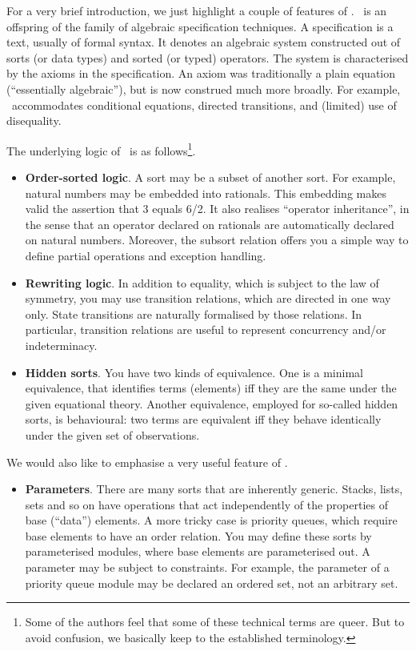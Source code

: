 \documentclass[a4paper]{memoir}
\begin{document}
For a very brief introduction, we just highlight a couple of features
of \cafeobj. \cafeobj~is an offspring of the family of algebraic
specification techniques. A specification is a text, usually of
formal syntax. It denotes an algebraic system constructed out of
sorts (or data types) and sorted (or typed) operators. The system
is characterised by the axioms in the specification. An axiom was
traditionally a plain equation (``essentially algebraic''), but is now
construed much more broadly. For example, \cafeobj~accommodates
conditional equations, directed transitions, and (limited) use of
disequality.

The underlying logic of \cafeobj~is as follows\footnote{
 Some of the authors feel that some of these technical terms are
 queer. But to avoid confusion, we basically keep to the
 established terminology.
}.
\begin{itemize}
\item[]\textbf{ Order-sorted logic}\cite{osa}. A sort may be a subset of
  another sort. For example, natural numbers may be embedded into rationals.
  This embedding makes valid the assertion that 3 equals 6/2. It also
  realises ``operator inheritance'', in the sense that an operator
  declared on rationals are automatically declared on natural numbers.
  Moreover, the subsort relation offers you a simple way to define
  partial operations and exception handling.
\item[] \textbf{ Rewriting logic}\cite{rew-logic}. In addition to equality,
  which is subject to the law of symmetry, you may use transition relations,
  which are directed in one way only. State transitions are
  naturally formalised by those relations. In particular, transition
  relations are useful to represent concurrency and/or indeterminacy.
\item[]\textbf{ Hidden sorts}\cite{hsa}. You have two kinds of equivalence. One
  is a minimal equivalence, that identifies terms (elements) iff
  they are the same under the given equational theory. Another
  equivalence, employed for so-called hidden sorts, is behavioural:
  two terms are equivalent iff they behave identically under the
  given set of observations.
\end{itemize}
We would also like to emphasise a very useful feature of \cafeobj.
\begin{itemize}
\item[]\textbf{ Parameters}. There are many sorts that are inherently
  generic. Stacks, lists, sets and so on have operations that
  act independently of the properties of base (``data'') elements.
  A more tricky case is priority queues, which require base elements to
  have an order relation. You may define these sorts by
  parameterised modules, where base elements are parameterised out.
  A parameter may be subject to constraints. For example, the parameter
  of a priority queue module may be declared an ordered set, not
  an arbitrary set.
\end{itemize}
\end{document}
